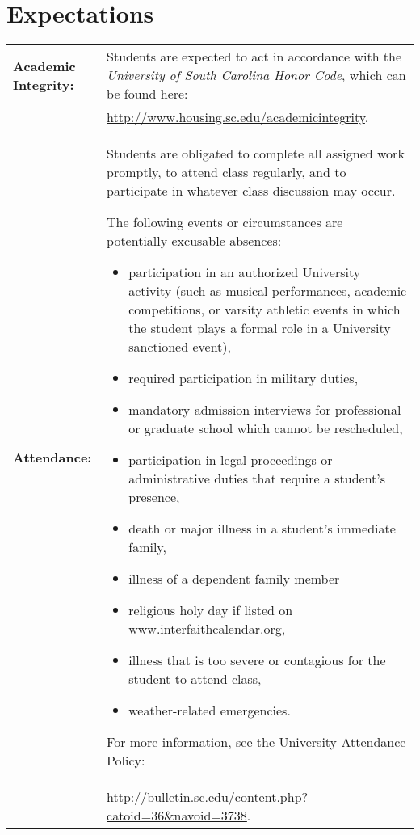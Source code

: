 \documentclass[10pt]{amsart}
\begin{document}
\section*{Expectations}
\noindent
\begin{tabular}{p{1.4in}p{5in}}
  {\bf Academic Integrity:} & Students are expected to act in accordance with the {\it University of South Carolina Honor Code}, 
  which can be found here: \\
  & \url{http://www.housing.sc.edu/academicintegrity}.\\
  {\bf Attendance:} & Students are obligated to complete all assigned work promptly, to attend class regularly, and to participate in whatever class discussion may occur.

  The following events or circumstances are potentially excusable absences:
  \begin{itemize}
  \item
    participation in an authorized University activity (such as musical performances, academic competitions, or varsity athletic events in which the student plays a formal role in a University sanctioned event),
  \item
    required participation in military duties,
  \item
    mandatory admission interviews for professional or graduate school which cannot be rescheduled,
  \item
    participation in legal proceedings or administrative duties that require a student's presence,
  \item
    death or major illness in a student’s immediate family,
  \item
    illness of a dependent family member
  \item
    religious holy day if listed on \url{www.interfaithcalendar.org},
  \item
    illness that is too severe or contagious for the student to attend class,
  \item
    weather-related emergencies.
  \end{itemize}
  For more information, see the University Attendance Policy: \\
  &\url{http://bulletin.sc.edu/content.php?catoid=36\&navoid=3738}.
\end{tabular}
\end{document}
